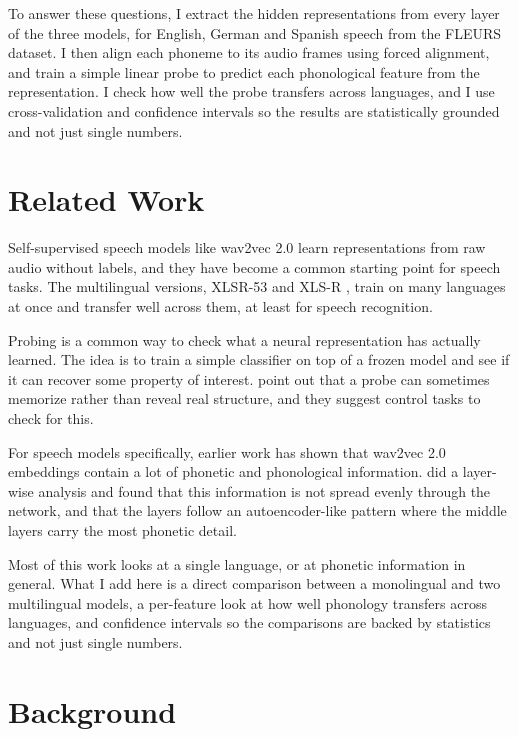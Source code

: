 \documentclass[twoside,11pt]{article}
\begin{document}
To answer these questions, I extract the hidden representations from every layer
of the three models, for English, German and Spanish speech from the FLEURS
dataset. I then align each phoneme to its audio frames using forced alignment, and
train a simple linear probe to predict each phonological feature from the
representation. I check how well the probe transfers across languages, and I use
cross-validation and confidence intervals so the results are statistically
grounded and not just single numbers.

\section{Related Work}

Self-supervised speech models like wav2vec 2.0 \citep{baevski2020wav2vec} learn
representations from raw audio without labels, and they have become a common
starting point for speech tasks. The multilingual versions, XLSR-53
\citep{conneau2021xlsr} and XLS-R \citep{babu2022xlsr}, train on many languages at
once and transfer well across them, at least for speech recognition.

Probing is a common way to check what a neural representation has actually
learned. The idea is to train a simple classifier on top of a frozen model and see
if it can recover some property of interest. \citet{hewitt2019control} point out
that a probe can sometimes memorize rather than reveal real structure, and they
suggest control tasks to check for this.

For speech models specifically, earlier work has shown that wav2vec 2.0 embeddings
contain a lot of phonetic and phonological information. \citet{pasad2021layerwise}
did a layer-wise analysis and found that this information is not spread evenly
through the network, and that the layers follow an autoencoder-like pattern where
the middle layers carry the most phonetic detail.

Most of this work looks at a single language, or at phonetic information in
general. What I add here is a direct comparison between a monolingual and two
multilingual models, a per-feature look at how well phonology transfers across
languages, and confidence intervals so the comparisons are backed by statistics
and not just single numbers.

\section{Background}
\end{document}
